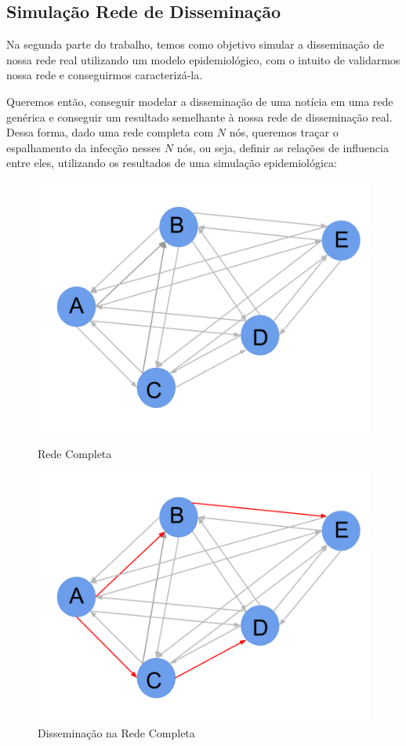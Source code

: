 \documentclass[a4paper,12pt]{article}
\begin{document}
 
\pagebreak
\subsection{Simulação Rede de Disseminação}

Na segunda parte do trabalho, temos como objetivo simular a disseminação de nossa rede real utilizando um modelo epidemiológico, com o intuito
de validarmos nossa rede e conseguirmos caracterizá-la.

Queremos então, conseguir modelar a disseminação de uma notícia em uma rede genérica e conseguir um resultado semelhante à nossa rede de
disseminação real. Dessa forma, dado uma rede completa com $N$ nós, queremos traçar o espalhamento da infecção nesses $N$ nós, ou seja, definir
as relações de influencia entre eles, utilizando os resultados de uma simulação epidemiológica:
\vspace{0.4cm}

\begin{figure}[ht]
\centering
\begin{minipage}{.5\textwidth}
  \centering
  \includegraphics[width=.9\linewidth]{./rede3.png}
  \caption{Rede Completa}
  \label{fig:test1}
\end{minipage}%
\begin{minipage}{.5\textwidth}
  \centering
  \includegraphics[width=.9\linewidth]{./rede4.png}
  \caption{Disseminação na Rede Completa}
  \label{fig:test2}
\end{minipage}
\end{figure}
\end{document}
